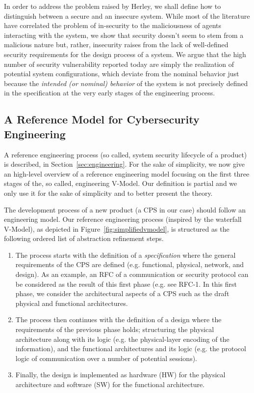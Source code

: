 In order to address the problem raised by Herley, we shall define how to
distinguish between a secure and an insecure system.  While most of the
literature have correlated the problem of in-security
to the maliciousness of agents interacting with the system, we show that
security doesn't seem to stem from a malicious nature but, rather, insecurity
raises from the lack of well-defined security requirements for the design
process of a system. We argue that the high number of security vulnerability
reported today are simply the realization of potential system configurations,
which deviate from the nominal behavior just because the \emph{intended (or
nominal) behavior} of the system is not precisely defined in the specification
at the very early stages of the engineering process.   

\subsection{A Reference Model for Cybersecurity Engineering}\label{sec:vmodel}
A reference engineering process (so called, system security lifecycle of a
product) is described, in Section~\ref{sec:engineering}.  For the sake of
simplicity, we now give an high-level overview of a reference engineering model
focusing on the first three stages of the, so called, engineering V-Model. Our
definition is partial and we only use it for the sake of simplicity and to
better present the theory.

The development process of a new product (a CPS in our case) 
should follow an engineering model. Our reference engineering process 
(inspired by the waterfall V-Model), as depicted in
Figure~\ref{fig:simplifiedvmodel}, is structured as the following ordered list
of abstraction refinement steps.
\begin{enumerate}
	\item The process starts with the definition of a \emph{specification}
		where the general requirements of the CPS are defined (e.g.
		functional, physical, network, and design).  As an example, an
		RFC of a communication or security protocol can be considered
		as the result of this first phase (e.g. see
		RFC-1\autocite{rfc1}.  In this first phase, we consider the
		architectural aspects of a CPS such as the draft physical and
		functional architectures.
	\item The process then continues with the definition of a design where
		the requirements of the previous phase holds; structuring the
		physical architecture along with its logic (e.g. the physical-layer encoding of the
		information), and the functional architectures and its logic (e.g. the protocol
		logic of communication over a number of potential sessions).
	\item Finally, the design is implemented as hardware (HW) for the physical architecture
		and software (SW) for the functional architecture.
\end{enumerate}

